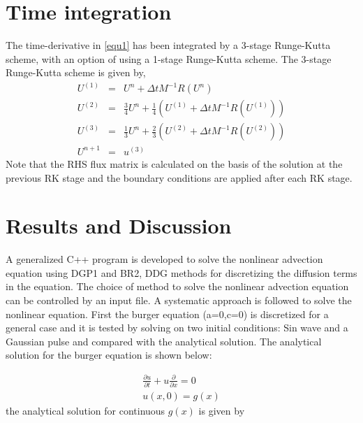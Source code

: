 \documentclass[12pt]{elsarticle}
\begin{document}
\section{Time integration}
The time-derivative in \ref{equ1} has been integrated by a 3-stage Runge-Kutta scheme, with an option of using a 1-stage Runge-Kutta scheme. The 3-stage Runge-Kutta scheme is given by,
\begin{equation}
\begin{array}{lcl}
U^{(1)} & = & U^n + \Delta t M^{-1}R(U^n)\\
U^{(2)} & = & \frac{3}{4} U^n + \frac{1}{4}(U^{(1)} + \Delta t M^{-1}R(U^{(1)}))\\
U^{(3)} & = & \frac{1}{3} U^n + \frac{2}{3}(U^{(2)} + \Delta t M^{-1}R(U^{(2)}))\\
U^{n+1} & = & u^{(3)}
\end{array}
\end{equation}
Note that the RHS flux matrix is calculated on the basis of the solution at the previous RK stage and the boundary conditions are applied after each RK stage.

\section{Results and Discussion}
A generalized C++ program is developed to solve the nonlinear advection equation using DGP1 and BR2, DDG methods for discretizing the diffusion terms in the equation. The choice of method to solve the nonlinear advection equation can be controlled by an input file. A systematic approach is followed to solve the nonlinear equation. First the burger equation (a=0,c=0) is discretized for  a general case and it is tested by solving on two initial conditions: Sin wave and a Gaussian pulse and compared with the analytical solution. The analytical solution for the burger equation is shown below:

\begin{equation}
\begin{gathered}
\frac{\partial u}{\partial t}+u\frac{\partial}{\partial x}=0\\
u(x,0)=g(x)
\end{gathered}
\end{equation}
the analytical solution for continuous $g(x)$ is given by
\end{document}
